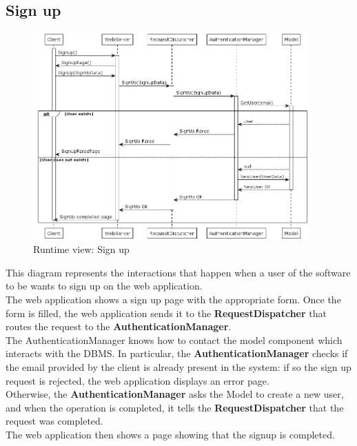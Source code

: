 \documentclass[10pt]{report}
\begin{document}
\subsection{Sign up}
\begin{figure}[H]
    \centering
    \includegraphics[width=400px]{SequenceDiagram/signup.png}
    \caption{Runtime view: Sign up}
\end{figure}
This diagram represents the interactions that happen when a user of the software to be wants to sign up on the web application.\\ The web application shows a sign up page with the appropriate form. Once the form is filled, the web application sends it to the \textbf{RequestDispatcher} that routes the request to the \textbf{AuthenticationManager}.\\
The AuthenticationManager knows how to contact the model component which interacts with the DBMS. 
In particular, the \textbf{AuthenticationManager} checks if the email provided by the client is already present in the system: if so the sign up request is rejected, the web application displays an error page.\\ Otherwise, the \textbf{AuthenticationManager} asks the Model to create a new user, and when the operation is completed, it tells the \textbf{RequestDispatcher} that the request was completed.\\ The web application then shows a page showing that the signup is completed.
\end{document}
